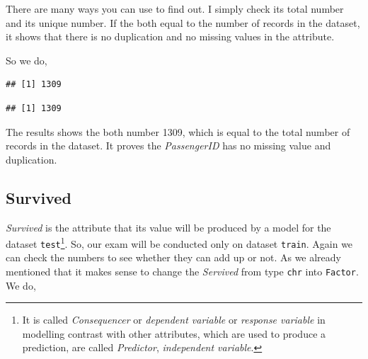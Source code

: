 \documentclass[
]{book}
\newenvironment{Shaded}{\begin{snugshade}}{\end{snugshade}}
\newcommand{\CommentTok}[1]{\textcolor[rgb]{0.56,0.35,0.01}{\textit{#1}}}
\newcommand{\DataTypeTok}[1]{\textcolor[rgb]{0.13,0.29,0.53}{#1}}
\newcommand{\KeywordTok}[1]{\textcolor[rgb]{0.13,0.29,0.53}{\textbf{#1}}}
\newcommand{\NormalTok}[1]{#1}
\newcommand{\OperatorTok}[1]{\textcolor[rgb]{0.81,0.36,0.00}{\textbf{#1}}}
\newcommand{\StringTok}[1]{\textcolor[rgb]{0.31,0.60,0.02}{#1}}
\begin{document}
There are many ways you can use to find out. I simply check its total number and its unique number. If the both equal to the number of records in the dataset, it shows that there is no duplication and no missing values in the attribute.

So we do,

\begin{Shaded}
\end{Shaded}

\begin{verbatim}
## [1] 1309
\end{verbatim}

\begin{Shaded}
\end{Shaded}

\begin{verbatim}
## [1] 1309
\end{verbatim}

The results shows the both number 1309, which is equal to the total number of records in the dataset. It proves the \emph{PassengerID} has no missing value and duplication.

\hypertarget{survive}{%
\subsection*{Survived}\label{survive}}


\emph{Survived} is the attribute that its value will be produced by a model for the dataset \texttt{test}\footnote{It is called \emph{Consequencer} or \emph{dependent variable} or \emph{response variable} in modelling contrast with other attributes, which are used to produce a prediction, are called \emph{Predictor}, \emph{independent variable}.}. So, our exam will be conducted only on dataset \texttt{train}. Again we can check the numbers to see whether they can add up or not. As we already mentioned that it makes sense to change the \emph{Servived} from type \texttt{chr} into \texttt{Factor}. We do,

\begin{Shaded}
\end{Shaded}
\end{document}
